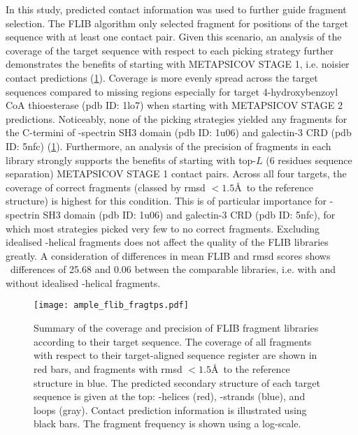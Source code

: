 In this study, predicted contact information was used to further guide fragment selection. The FLIB algorithm only selected fragment for positions of the target sequence with at least one contact pair. Given this scenario, an analysis of the coverage of the target sequence with respect to each picking strategy further demonstrates the benefits of starting with METAPSICOV STAGE 1, i.e. noisier contact predictions (\cref{fig:ample_flib_fragtps}). Coverage is more evenly spread across the target sequences compared to missing regions especially for target 4-hydroxybenzoyl CoA thioesterase (\gls{pdb} ID: 1lo7) when starting with METAPSICOV STAGE 2 predictions. Noticeably, none of the picking strategies yielded any fragments for the C-termini of \textalpha-spectrin SH3 domain (\gls{pdb} ID: 1u06) and galectin-3 CRD (\gls{pdb} ID: 5nfc) (\cref{fig:ample_flib_fragtps}). Furthermore, an analysis of the precision of fragments in each library strongly supports the benefits of starting with top-$L$ (6 residues sequence separation) METAPSICOV STAGE 1 contact pairs. Across all four targets, the coverage of correct fragments (classed by \gls{rmsd} $<1.5$\AA\ to the reference structure) is highest for this condition. This is of particular importance for \textalpha-spectrin SH3 domain (\gls{pdb} ID: 1u06) and galectin-3 CRD (\gls{pdb} ID: 5nfc), for which most strategies picked very few to no correct fragments. Excluding idealised \textalpha-helical fragments does not affect the quality of the FLIB libraries greatly. A consideration of differences in mean FLIB and \gls{rmsd} scores shows \textDelta\ differences of 25.68 and 0.06 between the comparable libraries, i.e. with and without idealised \textalpha-helical fragments.

\begin{figure}[H]
	\centering
	\texttt{[image: ample\_flib\_fragtps.pdf]}
	\caption[Coverage and precision of Flib fragment libraries]{Summary of the coverage and precision of FLIB fragment libraries according to their target sequence. The coverage of all fragments with respect to their target-aligned sequence register are shown in red bars, and fragments with \gls{rmsd} $<1.5$\AA\ to the reference structure in blue. The predicted secondary structure of each target sequence is given at the top: \textalpha-helices (red), \textbeta-strands (blue), and loops (gray). Contact prediction information is illustrated using black bars. The fragment frequency is shown using a log-scale.}
	\label{fig:ample_flib_fragtps}
\end{figure}

